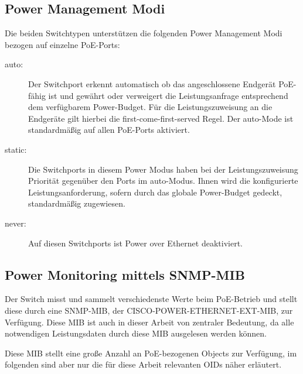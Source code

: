 \subsection{Power Management Modi}
\label{subsec:power-management-modes}
Die beiden Switchtypen unterst\"utzen die folgenden Power Management Modi bezogen auf einzelne PoE-Ports:
\begin{description}
\item [auto:] Der Switchport erkennt automatisch ob das angeschlossene Endger\"at PoE-f\"ahig ist und gew\"ahrt oder verweigert die Leistungsanfrage entsprechend dem verf\"ugbarem Power-Budget. F\"ur die Leistungszuweisung an die Endger\"ate gilt hierbei die first-come-first-served Regel. Der auto-Mode ist standardm\"a{\ss}ig auf allen PoE-Ports aktiviert.
\item [static:] Die Switchports in diesem Power Modus haben bei der Leistungszuweisung Priorit\"at gegen\"uber den Ports im auto-Modus. Ihnen wird die konfigurierte Leistungsanforderung, sofern durch das globale Power-Budget gedeckt, standardm\"a{\ss}ig zugewiesen.
\item [never:] Auf diesen Switchports ist Power over Ethernet deaktiviert. 
\end{description}

\subsection{Power Monitoring mittels SNMP-MIB}
Der Switch misst und sammelt verschiedenste Werte beim PoE-Betrieb und stellt diese durch eine SNMP-MIB, der CISCO-POWER-ETHERNET-EXT-MIB\cite{cisco-poe-ext-mib}, zur Verf\"ugung.
Diese MIB ist auch in dieser Arbeit von zentraler Bedeutung, da alle notwendigen Leistungsdaten durch diese MIB ausgelesen werden k\"onnen.

Diese MIB stellt eine gro{\ss}e Anzahl an PoE-bezogenen Objects zur Verf\"ugung, im folgenden sind aber nur die f\"ur diese Arbeit relevanten OIDs n\"aher erl\"autert.

